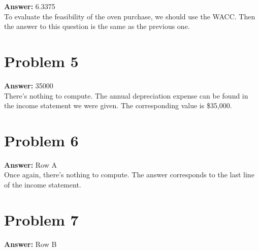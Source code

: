 \documentclass[11pt]{article}
\begin{document}
\textbf{Answer:} 6.3375\\

To evaluate the feasibility of the oven purchase, we should use the WACC. Then
the answer to this question is the same as the previous one.
\section*{Problem 5}
\label{sec:orgdc8c011}

\textbf{Answer:} 35000\\

There's nothing to compute. The annual depreciation expense can be found in the
income statement we were given. The corresponding value is \$35,000.
\section*{Problem 6}
\label{sec:org9bec02e}

\textbf{Answer:} Row A\\

Once again, there's nothing to compute. The answer corresponds to the last line
of the income statement.
\section*{Problem 7}
\label{sec:org3ed4f80}

\textbf{Answer:} Row B\\
\end{document}
